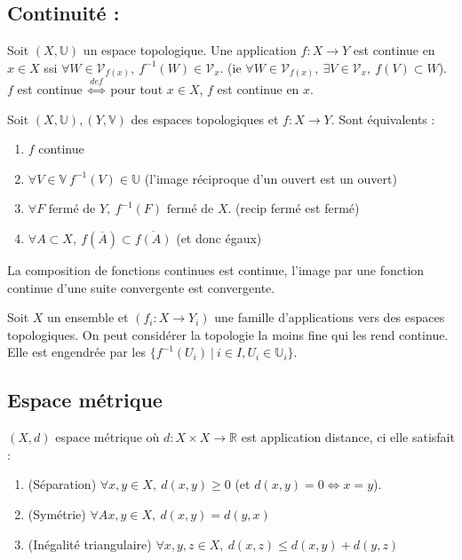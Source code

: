 \subsection{ Continuité :}
\begin{definition}
        Soit $(X,\mathbb{U})$ un espace topologique. Une application $f:X\to Y$ est continue en $x\in X$ ssi $\forall W\in \mathcal{V}_{f(x)}, \ f^{-1}(W)\in \mathcal{V}_x$. (ie $\forall W\in \mathcal{V}_{f(x)},\ \exists V\in \mathcal{V}_x,\ f(V)\subset W$). $f$ est continue $\overset{def}{\Leftrightarrow }$ pour tout $x\in X$, $f$ est continue en $x$. \\

\end{definition}
\begin{definition}
    Soit $(X,\mathbb{U}), (Y,\mathbb{V})$ des espaces topologiques et $f:X\to Y$. Sont équivalents :
    \begin{enumerate}
        \item $f$ continue
        \item $\forall V\in \mathbb{V}\ f^{-1}(V)\in \mathbb{U}$ (l'image réciproque d'un ouvert est un ouvert)
        \item $\forall F\text{ fermé de }Y,\ f^{-1}(F) \text{ fermé de }X$. (recip fermé est fermé)
        \item $\forall A\subset X,\ f(\overline{A})\subset \overline{f(A)}$ (et donc égaux)
    \end{enumerate}
\end{definition}

La composition de fonctions continues est continue, l'image par une fonction continue d'une suite convergente est convergente.
\begin{ex}
         Soit $X$ un ensemble et $(f_i:X\to Y_i)$ une famille d'applications vers des espaces topologiques. On peut considérer la topologie la moins fine qui les rend continue. Elle est engendrée par les $\{f^{-1}(U_i)\ |\ i\in I, U_i\in \mathbb{U}_i\}$.
\end{ex}

\subsection{Espace métrique}
\begin{definition}
    $(X,d)$ espace métrique où $d:X\times X\to \mathbb{R} $ est application distance, ci elle satisfait :
    \begin{enumerate}
        \item(Séparation) $\forall x,y\in X,\ d(x,y)\ge 0$ (et $d(x,y)=0\Leftrightarrow x=y$).
        \item (Symétrie) $\forall Ax,y\in X,\ d(x,y)=d(y,x)$
        \item (Inégalité triangulaire) $\forall x,y,z\in X,\ d(x,z)\le d(x,y)+d(y,z)$
    \end{enumerate}
\end{definition}

